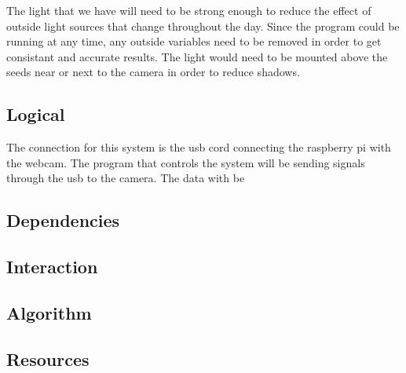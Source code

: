 The light that we have will need to be strong enough to reduce the effect of outside light sources that change throughout the day. Since the program could be running at any time, any outside variables need to be removed in order to get consistant and accurate results. The light would need to be mounted above the seeds near or next to the camera in order to reduce shadows. 

\subsection{Logical}
The connection for this system is the usb cord connecting the raspberry pi with the webcam. The program that controls the system will be sending signals through the usb to the camera. The data with be 

\subsection{Dependencies}

\subsection{Interaction}

\subsection{Algorithm}

\subsection{Resources}
